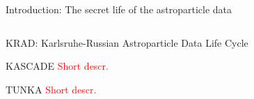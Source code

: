 \documentclass[18pt]{beamer}
\begin{document}
\begin{frame}{Introduction: The secret life of the astroparticle data}
\begin{columns}
\begin{column}[t]{0.53\textwidth}
  \end{column}
\end{columns}
\end{frame}

\begin{frame}{\textcolor{kit-green100}{KRAD}: \textcolor{kit-green100}{K}arlsruhe-\textcolor{kit-green100}{R}ussian \textcolor{kit-green100}{A}stroparticle \textcolor{kit-green100}{D}ata Life Cycle}

\end{frame}

\begin{frame}{KASCADE}
\textcolor{red}{Short descr.}
\end{frame}

\begin{frame}{TUNKA}
\textcolor{red}{Short descr.}
\end{frame}
\end{document}
